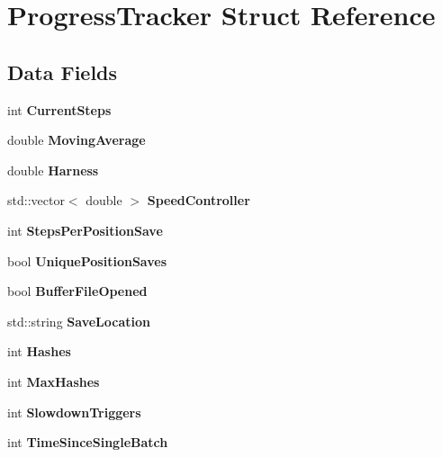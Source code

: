 \hypertarget{structProgressTracker}{}\section{Progress\+Tracker Struct Reference}
\label{structProgressTracker}
\subsection*{Data Fields}
\begin{DoxyCompactItemize}
\item 
\mbox{\label{structProgressTracker_aa531f094e8ad975dfefc47ece359592d}} 
int {\bfseries Current\+Steps}
\item 
\mbox{\label{structProgressTracker_a6dfeb8637c85c7310af398578d221bac}} 
double {\bfseries Moving\+Average}
\item 
\mbox{\label{structProgressTracker_ae1c6ce39fe19ccf2d99e04d84bf8c52f}} 
double {\bfseries Harness}
\item 
\mbox{\label{structProgressTracker_a278dfc52759a8b774b7df65ddd474cbb}} 
std\+::vector$<$ double $>$ {\bfseries Speed\+Controller}
\item 
\mbox{\label{structProgressTracker_a972f79a55a785d579031f956e52f92e8}} 
int {\bfseries Steps\+Per\+Position\+Save}
\item 
\mbox{\label{structProgressTracker_a42a1492c36b842d23968e36c01b58b91}} 
bool {\bfseries Unique\+Position\+Saves}
\item 
\mbox{\label{structProgressTracker_a89936bd25d378bb4c90fa278ce7cc373}} 
bool {\bfseries Buffer\+File\+Opened}
\item 
\mbox{\label{structProgressTracker_a1f87aa774affb12847fdf90e912ac147}} 
std\+::string {\bfseries Save\+Location}
\item 
\mbox{\label{structProgressTracker_a5b3ece79bcfab593be27396d393f6370}} 
int {\bfseries Hashes}
\item 
\mbox{\label{structProgressTracker_ad0995169886380eae9bed1c416e20fe7}} 
int {\bfseries Max\+Hashes}
\item 
\mbox{\label{structProgressTracker_aa9e165a0b18af7d137a7b7bacf7e43bd}} 
int {\bfseries Slowdown\+Triggers}
\item 
\mbox{\label{structProgressTracker_aa9d40fe1375a0e92aa429b8b1bf40ee6}} 
int {\bfseries Time\+Since\+Single\+Batch}
\end{DoxyCompactItemize}


